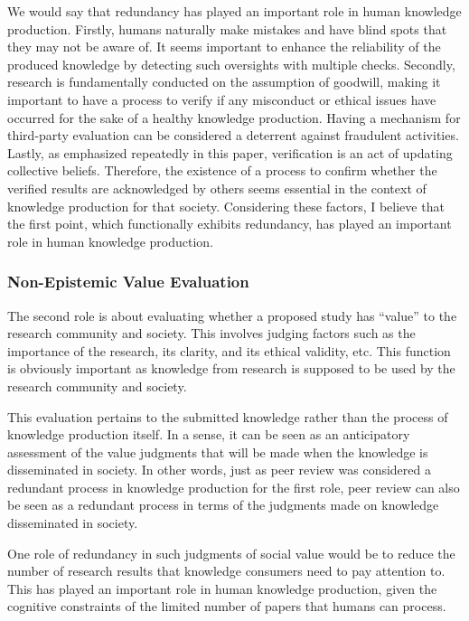 \documentclass{article}
\begin{document}
We would say that redundancy has played an important role in human knowledge production. Firstly, humans naturally make mistakes and have blind spots that they may not be aware of. It seems important to enhance the reliability of the produced knowledge by detecting such oversights with multiple checks. Secondly, research is fundamentally conducted on the assumption of goodwill, making it important to have a process to verify if any misconduct or ethical issues have occurred for the sake of a healthy knowledge production. Having a mechanism for third-party evaluation can be considered a deterrent against fraudulent activities. Lastly, as emphasized repeatedly in this paper, verification is an act of updating collective beliefs. Therefore, the existence of a process to confirm whether the verified results are acknowledged by others seems essential in the context of knowledge production for that society. Considering these factors, I believe that the first point, which functionally exhibits redundancy, has played an important role in human knowledge production.

\subsubsection{Non-Epistemic Value Evaluation}

The second role is about evaluating whether a proposed study has ``value'' to the research community and society. This involves judging factors such as the importance of the research, its clarity, and its ethical validity, etc. This function is obviously important as knowledge from research is supposed to be used by the research community and society.

This evaluation pertains to the submitted knowledge rather than the process of knowledge production itself. In a sense, it can be seen as an anticipatory assessment of the value judgments that will be made when the knowledge is disseminated in society. In other words, just as peer review was considered a redundant process in knowledge production for the first role, peer review can also be seen as a redundant process in terms of the judgments made on knowledge disseminated in society.

One role of redundancy in such judgments of social value would be to reduce the number of research results that knowledge consumers need to pay attention to. This has played an important role in human knowledge production, given the cognitive constraints of the limited number of papers that humans can process.
\end{document}
